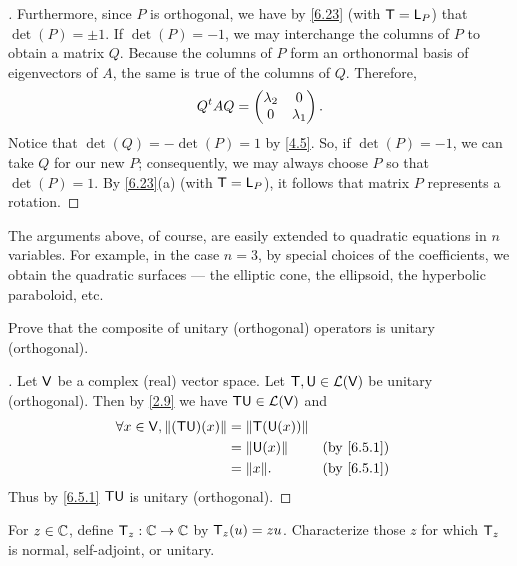 \begin{proof}[]
  Furthermore, since \(P\) is orthogonal, we have by \cref{6.23} (with \(\mathsf{T} = \mathsf{L}_P\)) that \(\det(P) = \pm 1\).
  If \(\det(P) = -1\), we may interchange the columns of \(P\) to obtain a matrix \(Q\).
  Because the columns of \(P\) form an orthonormal basis of eigenvectors of \(A\), the same is true of the columns of \(Q\).
  Therefore,
  \[
    {Q}^{t} A Q = \begin{pmatrix}
      \lambda_2 & 0         \\
      0         & \lambda_1
    \end{pmatrix}.
  \]
  Notice that \(\det(Q) = -\det(P) = 1\) by \cref{4.5}.
  So, if \(\det(P) = -1\), we can take \(Q\) for our new \(P\);
  consequently, we may always choose \(P\) so that \(\det(P) = 1\).
  By \cref{6.23}(a) (with \(\mathsf{T} = \mathsf{L}_P\)), it follows that matrix \(P\) represents a rotation.
\end{proof}

\begin{note}
  The arguments above, of course, are easily extended to quadratic equations in \(n\) variables.
  For example, in the case \(n = 3\), by special choices of the coefficients, we obtain the quadratic surfaces
  --- the elliptic cone, the ellipsoid, the hyperbolic paraboloid, etc.
\end{note}

\exercisesection

\setcounter{ex}{2}
\begin{ex}\label{ex:6.5.3}
  Prove that the composite of unitary (orthogonal) operators is unitary (orthogonal).
\end{ex}

\begin{proof}[]
  Let \(\mathsf{V}\) be a complex (real) vector space.
  Let \(\mathsf{T}, \mathsf{U} \in \mathcal{L}(\mathsf{V})\) be unitary (orthogonal).
  Then by \cref{2.9} we have \(\mathsf{T} \mathsf{U} \in \mathcal{L}(\mathsf{V})\) and
  \begin{align*}
    \forall x \in \V, \norm{(\T \U)(x)} & = \norm{\T(\U(x))}                 \\
                                        & = \norm{\U(x)}     &  & \by{6.5.1} \\
                                        & = \norm{x}.        &  & \by{6.5.1}
  \end{align*}
  Thus by \cref{6.5.1} \(\mathsf{T} \mathsf{U}\) is unitary (orthogonal).
\end{proof}

\begin{ex}\label{ex:6.5.4}
  For \(z \in \mathbb{C}\), define \(\mathsf{T}_z : \mathbb{C} \to \mathbb{C}\) by \(\mathsf{T}_z(u) = zu\).
  Characterize those \(z\) for which \(\mathsf{T}_z\) is normal, self-adjoint, or unitary.
\end{ex}

